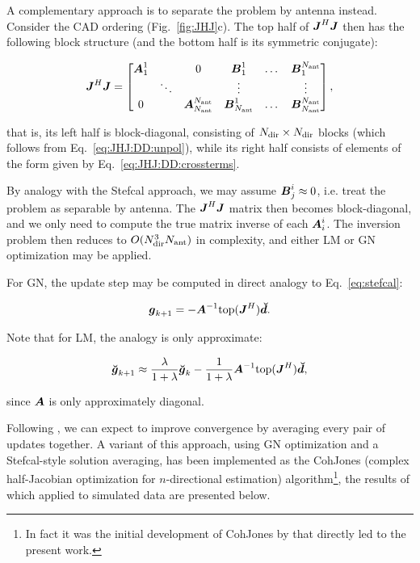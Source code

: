 \documentclass[useAMS,usenatbib]{mn2e}
\newcommand{\mat}[1]{{\bmath{#1}}}
\newcommand{\JJ}{\mat{J}} %
\newcommand{\JHJ}{\JJ^H\JJ} %
\begin{document}
A complementary approach is to separate the problem by antenna instead. Consider the CAD ordering (Fig.~\ref{fig:JHJ}c). 
The top half of $\JHJ$ then has the following block structure (and the bottom half is its symmetric conjugate):

\newcommand{\JJX}{\bmath{A}}
\newcommand{\JJY}{\bmath{B}}

\begin{equation}
\label{eq:JHJ:DD:blocked-ant}
\JHJ = \Matrix{cccccc}{\JJX^1_1 &  & 0 & \JJY^1_1 & \dots & \JJY^{\Na}_1 \\
 & \ddots &  & \vdots & & \vdots \\
0 &  & \JJX_{\Na}^{\Na} & \JJY_{\Na}^1 & \dots & \JJY_{\Na}^{\Na} },
\end{equation}

that is, its left half is block-diagonal, consisting of $N_\mathrm{dir}\times N_\mathrm{dir}$ blocks (which follows
from Eq.~\ref{eq:JHJ:DD:unpol}), while its right half consists of elements of the form given by
Eq.~\ref{eq:JHJ:DD:crossterms}. 

By analogy with the Stefcal approach, we may assume $\JJY^i_j \approx 0$, i.e. treat the problem as
separable by antenna. The $\JHJ$ matrix then becomes block-diagonal, and we only need to compute the 
true matrix inverse of each $\JJX^i_i$. The inversion problem then reduces to $O(N_\mathrm{dir}^3N_\mathrm{ant})$ in complexity,
and either LM or GN optimization may be applied.

For GN, the update step may be computed in direct analogy to Eq.~\ref{eq:stefcal}:

\[
\bmath{g}_{k+1} = -\bmath{A}^{-1} \TOP(\JJ^H) \Dd.
\]

Note that for LM, the analogy is only approximate:

\[
\Gg_{k+1} \approx \frac{\lambda}{1+\lambda}\Gg_k - \frac{1}{1+\lambda} \bmath{A}^{-1} \TOP(\JJ^H) \Dd,
\]

since $\bmath{A}$ is only approximately diagonal.

Following \citet{Stefcal}, we can expect to improve convergence by averaging every pair of updates together. 
A variant of this approach, using GN optimization and a Stefcal-style solution averaging, has been 
implemented as the {\sc CohJones} (complex half-Jacobian optimization for $n$-directional estimation) 
algorithm\footnote{In fact it was the initial development of {\sc CohJones} by \citet{tasse:cohjones} that directly led to the
present work.}, the results of which applied to simulated data are presented below.
\end{document}
